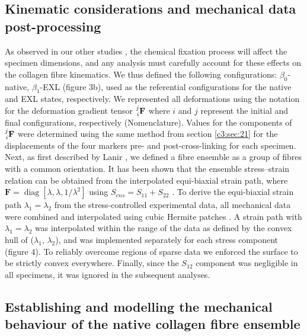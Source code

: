     
    
    
\subsection{Kinematic considerations and mechanical data post-processing}

    As observed in our other studies \cite{sacks_biaxial_2000}\cite{zhang_generalized_2015}, the chemical fixation process will affect the specimen dimensions, and any analysis must carefully account for these effects on the collagen fibre kinematics. We thus defined the following configurations: $\beta_0$-native, $\beta_1$-EXL (figure 3b), used as the referential configurations for the native and EXL states, respectively. We represented all deformations using the notation for the deformation gradient tensor $\prescript{j}{i}{\mathbf{F}}$ where $i$ and $j$ represent the initial and final configurations, respectively (Nomenclature). Values for the components of $\prescript{j}{i}{\mathbf{F}}$ were determined using the same method from section \ref{c3:sec:21} for the displacements of the four markers pre- and post-cross-linking for each specimen. Next, as first described by Lanir \cite{lanir_constitutive_1983}, we defined a fibre ensemble as a group of fibres with a common orientation. It has been shown that the ensemble stress–strain relation can be obtained from the interpolated equi-biaxial strain path, where $\mathbf{F} = \operatorname{diag}[\lambda, \lambda, 1/\lambda^2]$ using $S_{ens} = S_{11} + S_{22}$ \cite{sacks_incorporation_2003}. To derive the equi-biaxial strain path $\lambda_1 = \lambda_2$ from the stress-controlled experimental data, all mechanical data were combined and interpolated using cubic Hermite patches \cite{fata_insights_2014}. A strain path with $\lambda_1 = \lambda_2$ was interpolated within the range of the data as defined by the convex hull of ($\lambda_1$, $\lambda_2$), and was implemented separately for each stress component (figure 4). To reliably overcome regions of sparse data we enforced the surface to be strictly convex everywhere. Finally, since the $S_{12}$ component was negligible in all specimens, it was ignored in the subsequent analyses.
    
    


\subsection{Establishing and modelling the mechanical behaviour of the native collagen fibre ensemble}
    

